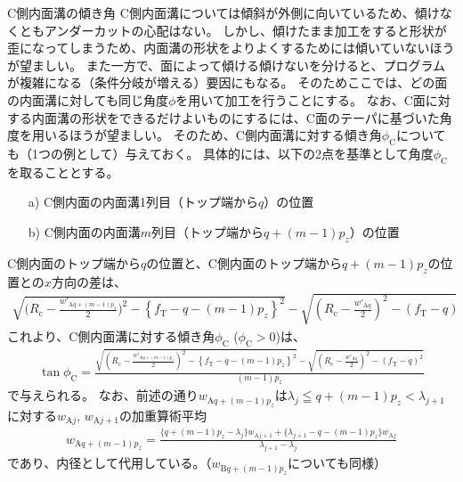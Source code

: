\begin{Column}{C側内面溝の傾き角}
C側内面溝については傾斜が外側に向いているため、傾けなくともアンダーカットの心配はない。
しかし、傾けたまま加工をすると形状が歪になってしまうため、内面溝の形状をよりよくするためには傾いていないほうが望ましい。
また一方で、面によって傾ける傾けないを分けると、プログラムが複雑になる（条件分岐が増える）要因にもなる。
そのためここでは、どの面の内面溝に対しても同じ角度$\phi$を用いて加工を行うことにする。
\tcbline*
なお、C面に対する内面溝の形状をできるだけよいものにするには、C面のテーパに基づいた角度を用いるほうが望ましい。
そのため、C側内面溝に対する傾き角$\phi_\mathrm C$についても（1つの例として）与えておく。
具体的には、以下の2点を基準として角度$\phi_\mathrm C$を取ることとする。
\begin{enumerate}
\item[a)]
C側内面の内面溝1列目（トップ端から$q$）の位置
\item[b)]
C側内面の内面溝$m$列目（トップ端から$q+(m-1)p_z$）の位置
\end{enumerate}
C側内面のトップ端から$q$の位置と、C側内面のトップ端から$q+(m-1)p_z$の位置との$x$方向の差は、
\begin{align*}
  \sqrt{\bigg(R_\mathrm c-\frac{w'_{\mathrm Aq+(m-1)p_z}}2\bigg)^{\!\!2}-\left\{f_\mathrm T-q-(m-1)p_z\right\}^2}
  -\sqrt{\left(R_\mathrm c-\frac{w'_{\mathrm Aq}}2\right)^{\!\!2}-(f_\mathrm T-q)^2}
\end{align*}
これより、C側内面溝に対する傾き角$\phi_\mathrm C$ ($\phi_\mathrm C > 0$)は、
\begin{align*}
  \tan\phi_\mathrm C
  = \frac{\sqrt{\left(R_\mathrm c-\frac{w'_{\mathrm Aq+(m-1)p_z}}2\right)^{\!2}
                -\left\{f_\mathrm T-q-(m-1)p_z\right\}^2}
          -\sqrt{\left(R_\mathrm c-\frac{w'_{\mathrm Aq}}2\right)^{\!2}-(f_\mathrm T-q)^2}}
         {(m-1)p_z}
\end{align*}
で与えられる。
なお、前述の通り$w_{\mathrm Aq+(m-1)p_z}$は$\lambda_j \leqq q+(m-1)p_z < \lambda_{j+1}$に対する$w_{\mathrm Aj}$, $w_{\mathrm Aj+1}$の加重算術平均
\begin{align*}
  w_{\mathrm Aq+(m-1)p_z}
  = \frac{\{q+(m-1)p_z-\lambda_j\}w_{\mathrm Aj+1}+\{\lambda_{j+1}-q-(m-1)p_z\}w_{\mathrm Aj}}
         {\lambda_{j+1}-\lambda_j}
\end{align*}
であり、内径として代用している。（$w_{\mathrm Bq+(m-1)p_z}$についても同様）
\end{Column}




